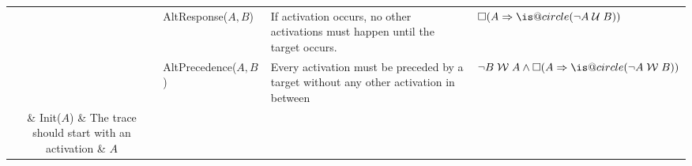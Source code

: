 \documentclass[sigconf]{acmart}
\makeatletter
\DeclareRobustCommand{\iscircle}{\mathord{\mathpalette\is@circle\relax}}
\newcommand\is@circle[2]{%
  \begingroup
  \sbox\z@{\raisebox{\depth}{$\m@th#1\bigcirc$}}%
  \sbox\tw@{$#1\square$}%
  \resizebox{!}{\ht\tw@}{\usebox{\z@}}%
  \endgroup
}
\newcommand{\Next}{\ensuremath{\iscircle}}
\newcommand{\Globally}{\ensuremath{\square}}
\newcommand{\Future}{\ensuremath{\Diamond}}
\newcommand{\WeakUntil}[2]{\ensuremath{{#1}\;\mathcal{W}\;{#2}}}
\newcommand{\DUntil}[2]{\ensuremath{{#1}\;\mathcal{U}\;{#2}}}
\newcommand{\DeclareClause}[5]{\textsf{#1}(\texttt{#2},\texttt{#4})}
\newcommand{\DeclareClauseNoData}[3]{\textsf{#1}(\texttt{#2},\texttt{#3})}
\makeatother
\begin{document}
\begin{table}[!th]
{\begin{tabular}{c|l|p{9cm}|l}
			& \textsf{AltResponse($A,B$) }  & If activation occurs, no other activations must happen until the target occurs.  & $\Globally(A\Rightarrow\Next(\DUntil{\neg A}{B}))$\\
			& \textsf{AltPrecedence($A,B$) }  & Every activation must be preceded by a target without any other
			activation in between &   $\WeakUntil{\neg B}{A}\wedge \Globally(A\Rightarrow \Next(\WeakUntil{\neg A}{B }))$\\
\midrule
	  \parbox[t]{2mm}{}  & \textsf{Init($A$)} & The trace should start with an activation & $A$\\
	 & \textsf{Exists($A,n$)} & Activations should occur at least $n$ times & $\Future(A\wedge \Next (\llbracket\textsf{Exists} (A,n-1)\rrbracket))$\\
	 & \textsf{Absence($A,n+1$)}  & Activations should occur at most $n$ times & $\neg \llbracket\textsf{Exists}$($A,n+1$)$\rrbracket$\\
	 & \textsf{Precedence($A,B$)}  & Events preceding the activations should not satisfy the target & $\WeakUntil{\neg B}{A}$\\
	& \textsf{Choice($A,A'$) }  & One of the two activation  conditions must appear. & $\Future A\vee\Future A'$ \\
	 & \textsf{Response($A,B$) } & The activation is either followed by or simultaneous to  the target. & $\Globally(A\Rightarrow\Future B)$ \\
	 & \textsf{RespExistence($A,B$) }  & The activation requires the existence of the target.& $\Future A\Rightarrow\Future B$ \\
	 & \textsf{ExlChoice($A,A'$) } & Only one activation condition must happen. & $\llbracket\DeclareClause{Choice}{A}{p}{A'}{p'}\rrbracket\wedge \llbracket\DeclareClause{NotCoExistence}{A}{p}{A'}{p'}\rrbracket$\\ 
	 & \textsf{CoExistence($A,B$) }  & \textsf{RespExistence}, and vice versa. & $ \llbracket\DeclareClauseNoData{RespExistence}{A}{B}\rrbracket\wedge \llbracket\DeclareClauseNoData{RespExistence}{B}{A}\rrbracket$\\
	 & \textsf{Succession($A,B$) }  & The target should only follow the activation. & $\llbracket\DeclareClauseNoData{Precedence}{A}{B}\rrbracket\wedge \llbracket\DeclareClauseNoData{Response}{A}{B}\rrbracket$\\

	 & \textsf{ChainSuccession($A,B$) }  & Activation immediately follows the target, and the target immediately preceeds the activation. & $\Globally(A\Leftrightarrow\Next B)$\\

	 
	& \textsf{NotCoExistence($A,B$) } & The activation \texttt{nand} the target happen.&  $\neg(\Future A \wedge\Future B)$\\
	 & \textsf{NotSuccession($A,B$)} & The activation requires that no target condition should follow.& $\Globally(A\Rightarrow \neg\Future B)$ \\
			\bottomrule
	\end{tabular}}
\end{table}
\end{document}

